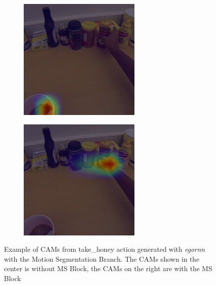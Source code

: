 \documentclass[10pt,twocolumn,hidelinks,letterpaper]{article}
\begin{document}
\begin{figure}[t]
\begin{subfigure}{.32\linewidth}
  \end{subfigure}
  \begin{subfigure}{.32\linewidth}
  	\includegraphics[width=\linewidth]{images/Cams2/S2_take_honey/rgb0007_CAM.png}
  \end{subfigure}
  \begin{subfigure}{.32\linewidth}
  	\includegraphics[width=\linewidth]{images/Cams2/S2_take_honey/rgb0007_CAM_MS.png}
  \end{subfigure}
  \caption{Example of CAMs from take\_honey action generated with \textit{egornn} with the Motion Segmentation Branch. The CAMs shown in the center is without MS Block, the CAMs on the right are with the MS Block}
  \label{cam2_1}
\end{figure}
\end{document}
